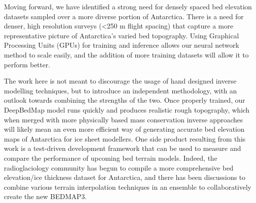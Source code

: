 \documentclass[tc, manuscript]{copernicus}
\begin{document}
Moving forward, we have identified a strong need for densely spaced bed elevation datasets sampled over a more diverse portion of Antarctica.
There is a need for denser, high resolution surveys (<250 m flight spacing) that capture a more representative picture of Antarctica's varied bed topography.
Using Graphical Processing Units (GPUs) for training and inference allows our neural network method to scale easily, and the addition of more training datasets will allow it to perform better.

The work here is not meant to discourage the usage of hand designed inverse modelling techniques, but to introduce an independent methodology, with an outlook towards combining the strengths of the two.
Once properly trained, our DeepBedMap model runs quickly and produces realistic rough topography, which when merged with more physically based mass conservation inverse approaches \citep[e.g.][]{MorlighemDeepglacialtroughs2019} will likely mean an even more efficient way of generating accurate bed elevation maps of Antarctica for ice sheet modellers.
One side product resulting from this work is a test-driven development framework that can be used to measure and compare the performance of upcoming bed terrain models.
Indeed, the radioglaciology community has begun to compile a more comprehensive bed elevation/ice thickness dataset for Antarctica, and there has been discussions to combine various terrain interpolation techniques in an ensemble to collaboratively create the new BEDMAP3.















\appendix
\end{document}
